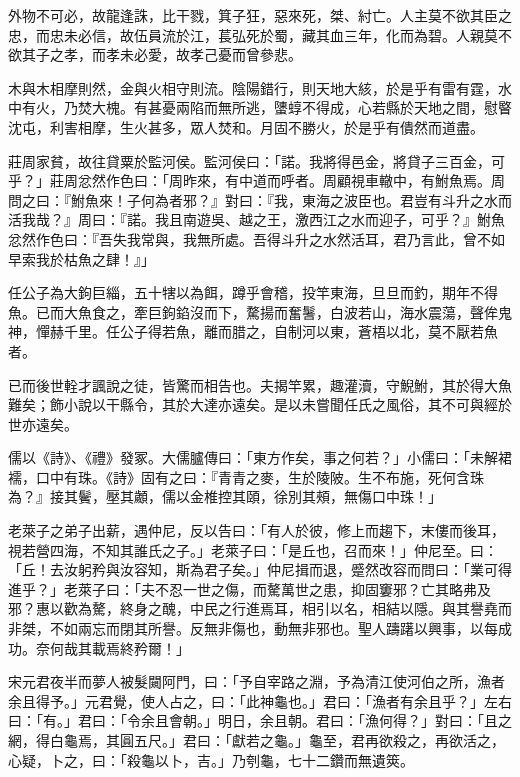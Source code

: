 
\begin{pinyinscope}
外物不可必，故龍逢誅，比干戮，箕子狂，惡來死，桀、紂亡。人主莫不欲其臣之忠，而忠未必信，故伍員流於江，萇弘死於蜀，藏其血三年，化而為碧。人親莫不欲其子之孝，而孝未必愛，故孝己憂而曾參悲。

木與木相摩則然，金與火相守則流。陰陽錯行，則天地大絯，於是乎有雷有霆，水中有火，乃焚大槐。有甚憂兩陷而無所逃，螴蜳不得成，心若縣於天地之間，慰睯沈屯，利害相摩，生火甚多，眾人焚和。月固不勝火，於是乎有僓然而道盡。

莊周家貧，故往貸粟於監河侯。監河侯曰：「諾。我將得邑金，將貸子三百金，可乎？」莊周忿然作色曰：「周昨來，有中道而呼者。周顧視車轍中，有鮒魚焉。周問之曰：『鮒魚來！子何為者邪？』對曰：『我，東海之波臣也。君豈有斗升之水而活我哉？』周曰：『諾。我且南遊吳、越之王，激西江之水而迎子，可乎？』鮒魚忿然作色曰：『吾失我常與，我無所處。吾得斗升之水然活耳，君乃言此，曾不如早索我於枯魚之肆！』」

任公子為大鉤巨緇，五十犗以為餌，蹲乎會稽，投竿東海，旦旦而釣，期年不得魚。已而大魚食之，牽巨鉤錎沒而下，騖揚而奮鬐，白波若山，海水震蕩，聲侔鬼神，憚赫千里。任公子得若魚，離而腊之，自制河以東，蒼梧以北，莫不厭若魚者。

已而後世輇才諷說之徒，皆驚而相告也。夫揭竿累，趣灌瀆，守鯢鮒，其於得大魚難矣；飾小說以干縣令，其於大達亦遠矣。是以未嘗聞任氏之風俗，其不可與經於世亦遠矣。

儒以《詩》、《禮》發冢。大儒臚傳曰：「東方作矣，事之何若？」小儒曰：「未解裙襦，口中有珠。《詩》固有之曰：『青青之麥，生於陵陂。生不布施，死何含珠為？』接其鬢，壓其顪，儒以金椎控其頤，徐別其頰，無傷口中珠！」

老萊子之弟子出薪，遇仲尼，反以告曰：「有人於彼，修上而趨下，末僂而後耳，視若營四海，不知其誰氏之子。」老萊子曰：「是丘也，召而來！」仲尼至。曰：「丘！去汝躬矜與汝容知，斯為君子矣。」仲尼揖而退，蹙然改容而問曰：「業可得進乎？」老萊子曰：「夫不忍一世之傷，而驁萬世之患，抑固窶邪？亡其略弗及邪？惠以歡為驁，終身之醜，中民之行進焉耳，相引以名，相結以隱。與其譽堯而非桀，不如兩忘而閉其所譽。反無非傷也，動無非邪也。聖人躊躇以興事，以每成功。奈何哉其載焉終矜爾！」

宋元君夜半而夢人被髮闚阿門，曰：「予自宰路之淵，予為清江使河伯之所，漁者余且得予。」元君覺，使人占之，曰：「此神龜也。」君曰：「漁者有余且乎？」左右曰：「有。」君曰：「令余且會朝。」明日，余且朝。君曰：「漁何得？」對曰：「且之網，得白龜焉，其圓五尺。」君曰：「獻若之龜。」龜至，君再欲殺之，再欲活之，心疑，卜之，曰：「殺龜以卜，吉。」乃刳龜，七十二鑽而無遺筴。


\end{pinyinscope}
